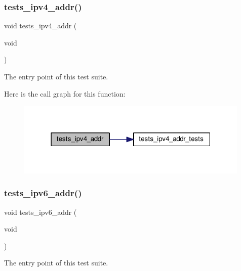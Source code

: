 \subsubsection{\texorpdfstring{tests\+\_\+ipv4\+\_\+addr()}{tests\_ipv4\_addr()}}
{\footnotesize\ttfamily void tests\+\_\+ipv4\+\_\+addr (\begin{DoxyParamCaption}\item[{void}]{ }\end{DoxyParamCaption})}



The entry point of this test suite. 

Here is the call graph for this function\+:
\nopagebreak
\begin{figure}[H]
\begin{center}
\leavevmode
\includegraphics[width=315pt]{group__unittests_ga629b2fe7a5d7d0f1623fbb0859868246_cgraph}
\end{center}
\end{figure}
\mbox{\label{group__unittests_gaa968d7cf1c200e4ec0394693683d8260}} 
\subsubsection{\texorpdfstring{tests\+\_\+ipv6\+\_\+addr()}{tests\_ipv6\_addr()}}
{\footnotesize\ttfamily void tests\+\_\+ipv6\+\_\+addr (\begin{DoxyParamCaption}\item[{void}]{ }\end{DoxyParamCaption})}



The entry point of this test suite. 


